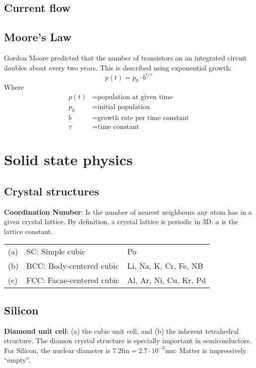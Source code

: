 \documentclass[a4paper, fontsize=8pt, landscape, DIV=1]{scrartcl}
\begin{document}
\begin{multicols*}{4}
    \subsection{Current flow}
    
    \subsection{Moore's Law}
    Gordon Moore predicted that the number of transistors on an integrated circuit doubles about every two years. This is described using exponential growth:
    \[p(t) = p_0 \cdot b^{t/\tau}\]
    Where
    \begin{align*}
      p(t) &= \text{population at given time} \\
      p_0 &= \text{initial population} \\
      b &= \text{growth rate per time constant} \\
      \tau &= \text{time constant}
    \end{align*}

  \section{Solid state physics}
  \subsection{Crystal structures}
  \textbf{Coordination Number}: Is the number of nearest neighbours any atom has in a given crystal lattice. By definition, a crystal lattice is periodic in 3D. $a$ is the lattice constant.

  \begin{tabular}[h]{l l p{1.5cm}}
    (a) & SC: Simple cubic & Po \\
    (b) & BCC: Body-centered cubic & Li, Na, K, Cr, Fe, NB \\
    (c) & FCC: Facae-centered cubic & Al, Ar, Ni, Cu, Kr, Pd \\
  \end{tabular}

  \subsection{Silicon}
  \textbf{Diamond unit cell}: (a) the cubic unit cell, and (b) the inherent tetrahedral structure. The diamon crystal structure is epecially important in semiconductors. For Silicon, the nuclear diameter is $7.2\text{fm} = 2.7\cdot 10^{-6}\text{nm}$: Matter is impressively ``empty''.


\end{multicols*}
\end{document}
